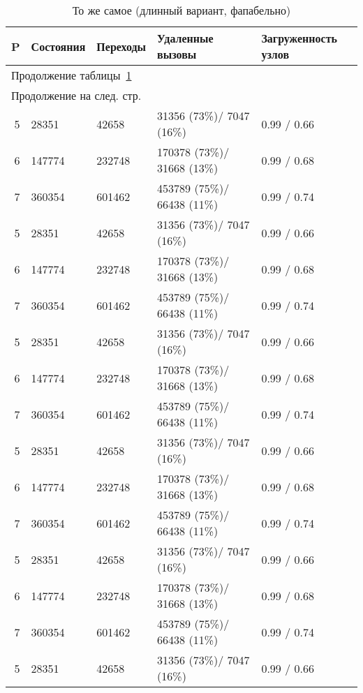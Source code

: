 \begin{center}
  \begin{longtable}{|r|l|l|l|p{}|}
    \caption{То же самое (длинный вариант, фапабельно)}
    \label{tab:paremu-stats}
    \\ \hline
    P & Состояния & Переходы & Удаленные вызовы & Загруженность узлов    \\
    \hline \endfirsthead
    \multicolumn{5}{l}{Продолжение таблицы~\ref{tab:paremu-stats}} \\
    \hline \endhead
    \hline \multicolumn{5}{l}{Продолжение на след. стр.} \\
    \endfoot
    \hline \endlastfoot

    5 & 28351     & 42658    & 31356  (73\%)/ 7047  (16\%) & 0.99 / 0.66 \\ 
    6 & 147774    & 232748   & 170378 (73\%)/ 31668 (13\%) & 0.99 / 0.68 \\ 
    7 & 360354    & 601462   & 453789 (75\%)/ 66438 (11\%) & 0.99 / 0.74 \\     
    5 & 28351     & 42658    & 31356  (73\%)/ 7047  (16\%) & 0.99 / 0.66 \\ 
    6 & 147774    & 232748   & 170378 (73\%)/ 31668 (13\%) & 0.99 / 0.68 \\ 
    7 & 360354    & 601462   & 453789 (75\%)/ 66438 (11\%) & 0.99 / 0.74 \\     
    5 & 28351     & 42658    & 31356  (73\%)/ 7047  (16\%) & 0.99 / 0.66 \\ 
    6 & 147774    & 232748   & 170378 (73\%)/ 31668 (13\%) & 0.99 / 0.68 \\ 
    7 & 360354    & 601462   & 453789 (75\%)/ 66438 (11\%) & 0.99 / 0.74 \\     
    5 & 28351     & 42658    & 31356  (73\%)/ 7047  (16\%) & 0.99 / 0.66 \\ 
    6 & 147774    & 232748   & 170378 (73\%)/ 31668 (13\%) & 0.99 / 0.68 \\ 
    7 & 360354    & 601462   & 453789 (75\%)/ 66438 (11\%) & 0.99 / 0.74 \\     
    5 & 28351     & 42658    & 31356  (73\%)/ 7047  (16\%) & 0.99 / 0.66 \\ 
    6 & 147774    & 232748   & 170378 (73\%)/ 31668 (13\%) & 0.99 / 0.68 \\ 
    7 & 360354    & 601462   & 453789 (75\%)/ 66438 (11\%) & 0.99 / 0.74 \\     
    5 & 28351     & 42658    & 31356  (73\%)/ 7047  (16\%) & 0.99 / 0.66 \\ 

\end{longtable}
\end{center}
